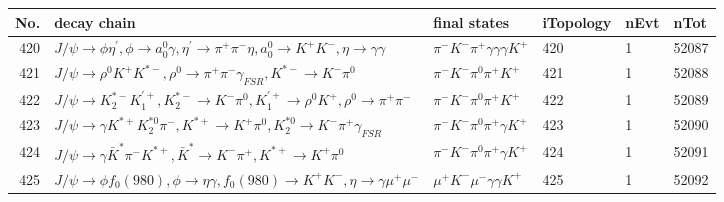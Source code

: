 \begin{table}[htbp] 
\begin{center}
\begin{small}
\begin{tabular}{rlllll}\hline\hline
 No. & decay chain & final states &  iTopology & nEvt & nTot \\\hline
420&$J/\psi       \rightarrow \phi           \eta^{\prime} , \phi            \rightarrow a_{0}^{0}      \gamma       , \eta^{\prime}  \rightarrow \pi^{+}        \pi^{-}        \eta          , a_{0}^{0}       \rightarrow K^{+}          K^{-}          , \eta           \rightarrow \gamma       \gamma       $&$\pi^{-}        K^{-}          \pi^{+}        \gamma       \gamma       \gamma       K^{+}          $&  420&    1&52087\\
421&$J/\psi       \rightarrow \rho^{0}      K^{+}          K^{*-}         , \rho^{0}       \rightarrow \pi^{+}        \pi^{-}        \gamma_{FSR} , K^{*-}          \rightarrow K^{-}          \pi^{0}        $&$\pi^{-}        K^{-}          \pi^{0}        \pi^{+}        K^{+}          $&  421&    1&52088\\
422&$J/\psi       \rightarrow K_2^{*-}       K_1^{'+}      , K_2^{*-}        \rightarrow K^{-}          \pi^{0}        , K_1^{'+}       \rightarrow \rho^{0}      K^{+}          , \rho^{0}       \rightarrow \pi^{+}        \pi^{-}        $&$\pi^{-}        K^{-}          \pi^{0}        \pi^{+}        K^{+}          $&  422&    1&52089\\
423&$J/\psi       \rightarrow \gamma       K^{*+}         K_2^{*0}       \pi^{-}        , K^{*+}          \rightarrow K^{+}          \pi^{0}        , K_2^{*0}        \rightarrow K^{-}          \pi^{+}        \gamma_{FSR} $&$\pi^{-}        K^{-}          \pi^{0}        \pi^{+}        \gamma       K^{+}          $&  423&    1&52090\\
424&$J/\psi       \rightarrow \gamma       \bar{K}^{*}   \pi^{-}        K^{*+}         , \bar{K}^{*}    \rightarrow K^{-}          \pi^{+}        , K^{*+}          \rightarrow K^{+}          \pi^{0}        $&$\pi^{-}        K^{-}          \pi^{0}        \pi^{+}        \gamma       K^{+}          $&  424&    1&52091\\
425&$J/\psi       \rightarrow \phi           f_{0}(980)     , \phi            \rightarrow \eta          \gamma       , f_{0}(980)      \rightarrow K^{+}          K^{-}          , \eta           \rightarrow \gamma       \mu^{+}      \mu^{-}      $&$\mu^{+}      K^{-}          \mu^{-}      \gamma       \gamma       K^{+}          $&  425&    1&52092\\

\end{tabular}
\end{small}
\end{center}
\end{table}
